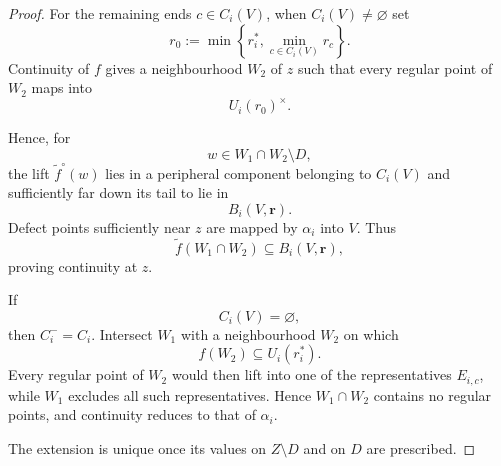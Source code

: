 \documentclass[10pt,a4paper]{amsart}
\begin{document}
\begin{proof}
For the remaining ends $c\in C_i(V)$, when $C_i(V)\neq\varnothing$ set
\[
r_0:=\min\left\{r_i^*,\min_{c\in C_i(V)}r_c\right\}.
\]
Continuity of $f$ gives a neighbourhood $W_2$ of $z$ such that every
regular point of $W_2$ maps into
\[
U_i(r_0)^\times.
\]

Hence, for
\[
w\in
W_1\cap W_2\setminus D,
\]
the lift $\widetilde f^\circ(w)$ lies in a peripheral component belonging
to $C_i(V)$ and sufficiently far down its tail to lie in
\[
B_i(V,\mathbf r).
\]
Defect points sufficiently near $z$ are mapped by $\alpha_i$ into $V$.
Thus
\[
\widetilde f(W_1\cap W_2)
\subseteq
B_i(V,\mathbf r),
\]
proving continuity at $z$.

If
\[
C_i(V)=\varnothing,
\]
then $C_i^-=C_i$.  Intersect $W_1$ with a neighbourhood $W_2$ on which
\[
f(W_2)\subseteq U_i(r_i^*).
\]
Every regular point of $W_2$ would then lift into one of the representatives
$E_{i,c}$, while $W_1$ excludes all such representatives.  Hence
$W_1\cap W_2$ contains no regular points, and continuity reduces to that of
$\alpha_i$.

The extension is unique once its values on $Z\setminus D$ and on $D$ are
prescribed.
\end{proof}
\end{document}
